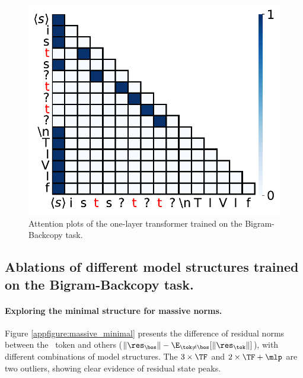 \begin{figure}[t]
\begin{minipage}{0.3\textwidth}
  \end{minipage}
  \begin{minipage}{0.3\textwidth}
      \centering
      \vspace{-.2em}
      \includegraphics[width=\linewidth]{Figures/BBM_appendix/app_attn_fig3.pdf}
  \end{minipage}
  \caption{\small Attention plots of the one-layer transformer trained on the Bigram-Backcopy task.}
  \label{appfigure:more-attn}
  \vspace{-1em}
\end{figure}

\subsection{Ablations of different model structures trained on the Bigram-Backcopy task.}

\paragraph{Exploring the minimal structure for massive norms.} Figure \ref{appfigure:massive_minimal} presents the difference of residual norms between the \bos~token and others ($\|\res_{\bos}\|-\E_{\tok\neq\bos}[\|\res_{\tok}\|]$), with different combinations of model structures. The $3\times \TF$ and $2\times \TF+\mlp$ are two outliers, showing clear evidence of residual state peaks.

